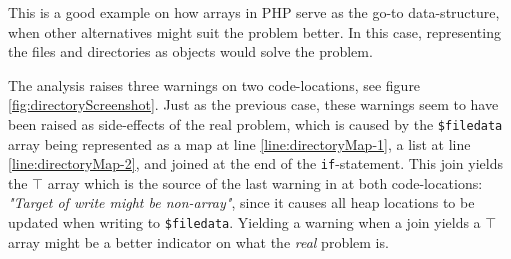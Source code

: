 This is a good example on how arrays in PHP serve as the go-to data-structure, when other alternatives might suit the problem better. In this case, representing the files and directories as objects would solve the problem.


The analysis raises three warnings on two code-locations, see figure \ref{fig:directoryScreenshot}. Just as the previous case, these warnings seem to have been raised as side-effects of the real problem, which is caused by the \texttt{\$filedata} array being represented as a map at line \ref{line:directoryMap-1}, a list at line \ref{line:directoryMap-2}, and joined at the end of the \texttt{if}-statement. This join yields the $\top$ array which is the source of the last warning in at both code-locations: \textit{"Target of write might be non-array"}, since it causes all heap locations to be updated when writing to \texttt{\$filedata}. Yielding a warning when a join yields a $\top$ array might be a better indicator on what the \textit{real} problem is.

